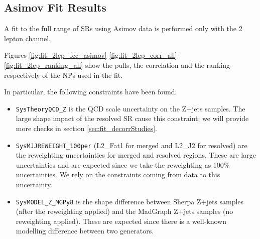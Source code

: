 

%

\clearpage

\subsection{Asimov Fit Results}
A fit to the full range of SRs using Asimov data is performed only with the 2 lepton channel.

Figures \ref{fig:fit_2lep_fcc_asimov}-\ref{fig:fit_2lep_corr_all}-\ref{fig:fit_2lep_ranking_all}
show the pulls, the correlation and the ranking respectively of the NPs used in the fit.

In particular, the following constraints have been found:
\begin{itemize}
       \item \texttt{SysTheoryQCD\_Z} is the QCD scale uncertainty on the Z+jets samples.
       The large shape impact of the resolved SR cause this constraint;
       we will provide more checks in section \ref{sec:fit_decorrStudies}.

       \item \texttt{SysMJJREWEIGHT\_100per} (L2\_Fat1 for merged and L2\_J2 for resolved)
       are the \mjjtag reweighting uncertainties for merged and resolved regions.
       These are large uncertainties and are expected since we take the \mjjtag reweighting as 100\% uncertainties.
       We rely on the constraints coming from data to this uncertainty.

       \item \texttt{SysMODEL\_Z\_MGPy8}
       is the shape difference between Sherpa Z+jets samples (after the \mjjtag reweighting applied)
       and the MadGraph Z+jets samples (no \mjjtag reweighting applied).
       These are expected since there is a well-known modelling difference between two generators.

\end{itemize}

